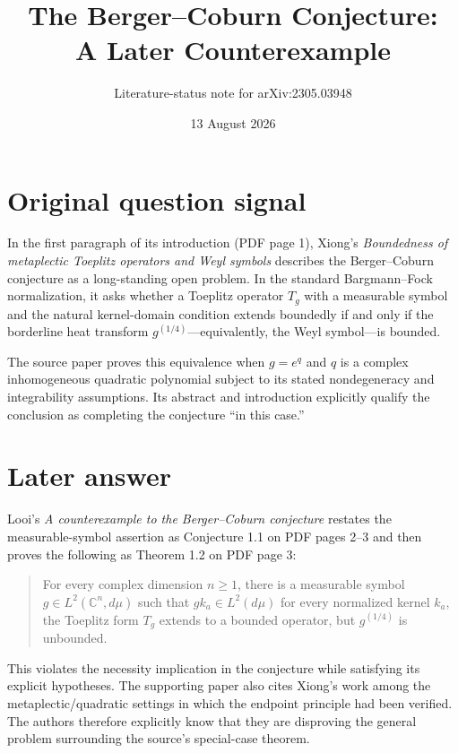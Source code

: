 \documentclass[11pt]{article}
\title{The Berger--Coburn Conjecture:\\A Later Counterexample}
\author{Literature-status note for arXiv:2305.03948}
\date{13 August 2026}
\newcommand{\C}{\mathbb C}
\begin{document}
\maketitle

\begin{center}
\end{center}

\section*{Original question signal}

In the first paragraph of its introduction (PDF page 1), Xiong's
\emph{Boundedness of metaplectic Toeplitz operators and Weyl symbols}
\cite{Xiong} describes the Berger--Coburn conjecture as a long-standing open
problem.  In the standard Bargmann--Fock normalization, it asks whether a
Toeplitz operator $T_g$ with a measurable symbol and the natural kernel-domain
condition extends boundedly if and only if the borderline heat transform
$g^{(1/4)}$---equivalently, the Weyl symbol---is bounded.

The source paper proves this equivalence when $g=e^q$ and $q$ is a complex
inhomogeneous quadratic polynomial subject to its stated nondegeneracy and
integrability assumptions.  Its abstract and introduction explicitly qualify
the conclusion as completing the conjecture ``in this case.''

\section*{Later answer}

Looi's \emph{A counterexample to the Berger--Coburn conjecture}
\cite{Looi} restates the measurable-symbol assertion as Conjecture 1.1 on PDF
pages 2--3 and then proves the following as Theorem 1.2 on PDF page 3:

\begin{quote}
For every complex dimension $n\geq1$, there is a measurable symbol
$g\in L^2(\C^n,d\mu)$ such that $gk_a\in L^2(d\mu)$ for every normalized
kernel $k_a$, the Toeplitz form $T_g$ extends to a bounded operator, but
$g^{(1/4)}$ is unbounded.
\end{quote}

This violates the necessity implication in the conjecture while satisfying
its explicit hypotheses.  The supporting paper also cites Xiong's work among
the metaplectic/quadratic settings in which the endpoint principle had been
verified.  The authors therefore explicitly know that they are disproving the
general problem surrounding the source's special-case theorem.
\end{document}
